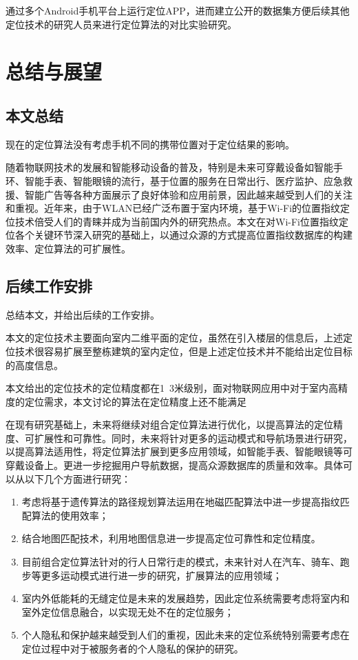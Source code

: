 通过多个Android手机平台上运行定位APP，进而建立公开的数据集方便后续其他定位技术的研究人员来进行定位算法的对比实验研究。




\chapter{总结与展望}

\section{本文总结}

现在的定位算法没有考虑手机不同的携带位置对于定位结果的影响。

随着物联网技术的发展和智能移动设备的普及，特别是未来可穿戴设备如智能手环、智能手表、智能眼镜的流行，基于位置的服务在日常出行、医疗监护、应急救援、智能广告等各种方面展示了良好体验和应用前景，因此越来越受到人们的关注和重视。近年来，由于WLAN已经广泛布置于室内环境，基于Wi-Fi的位置指纹定位技术倍受人们的青睐并成为当前国内外的研究热点。本文在对Wi-Fi位置指纹定位各个关键环节深入研究的基础上，以通过众源的方式提高位置指纹数据库的构建效率、定位算法的可扩展性。

\section{后续工作安排}

总结本文，并给出后续的工作安排。

本文的定位技术主要面向室内二维平面的定位，虽然在引入楼层的信息后，上述定位技术很容易扩展至整栋建筑的室内定位，但是上述定位技术并不能给出定位目标的高度信息。

本文给出的定位技术的定位精度都在1~3米级别，面对物联网应用中对于室内高精度的定位需求，本文讨论的算法在定位精度上还不能满足

在现有研究基础上，未来将继续对组合定位算法进行优化，以提高算法的定位精度、可扩展性和可靠性。同时，未来将针对更多的运动模式和导航场景进行研究，以提高算法适用性，将定位算法扩展到更多应用领域，如智能手表、智能眼镜等可穿戴设备上。更进一步挖掘用户导航数据，提高众源数据库的质量和效率。具体可以从以下几个方面进行研究：

\begin{enumerate}[1{）}]
	\item 考虑将基于遗传算法的路径规划算法运用在地磁匹配算法中进一步提高指纹匹配算法的使用效率；
	\item 结合地图匹配技术，利用地图信息进一步提高定位可靠性和定位精度。
	\item 目前组合定位算法针对的行人日常行走的模式，未来针对人在汽车、骑车、跑步等更多运动模式进行进一步的研究，扩展算法的应用领域；
	\item 室内外低能耗的无缝定位是未来的发展趋势，因此定位系统需要考虑将室内和室外定位信息融合，以实现无处不在的定位服务；
	\item 个人隐私和保护越来越受到人们的重视，因此未来的定位系统特别需要考虑在定位过程中对于被服务者的个人隐私的保护的研究。
\end{enumerate}

